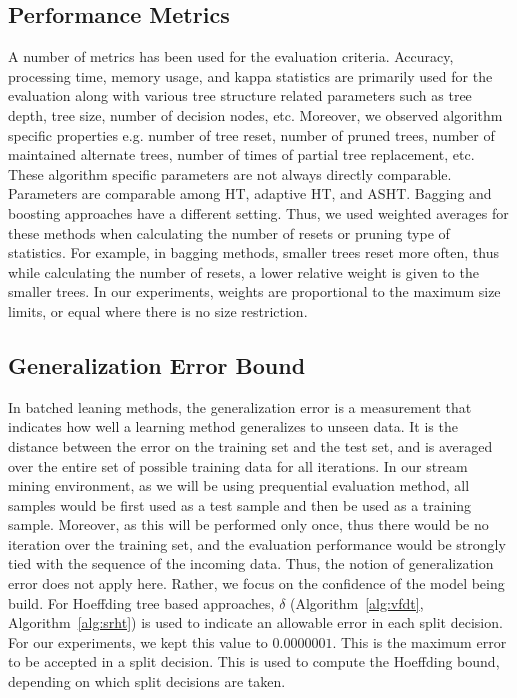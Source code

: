\subsection{Performance Metrics}
A number of metrics has been used for the evaluation criteria. Accuracy, processing time, memory usage, and kappa statistics are primarily used for the evaluation along with various tree structure related parameters such as tree depth, tree size, number of decision nodes, etc. Moreover, we observed algorithm specific properties e.g. number of tree reset, number of pruned trees, number of maintained alternate trees, number of times of partial tree replacement, etc. These algorithm specific parameters are not always directly comparable. Parameters are comparable among HT, adaptive HT, and ASHT. Bagging and boosting approaches have a different setting. Thus, we used weighted averages for these methods when calculating the number of resets or pruning type of statistics. For example, in bagging methods, smaller trees reset more often, thus while calculating the number of resets, a lower relative weight is given to the smaller trees. In our experiments, weights are proportional to the maximum size limits, or equal where there is no size restriction.

\subsection{Generalization Error Bound}
In batched leaning methods, the generalization error is a measurement that indicates how well a learning method generalizes to unseen data. It is the distance between the error on the training set and the test set, and is averaged over the entire set of possible training data for all iterations. In our stream mining environment, as we will be using prequential evaluation method, all samples would be first used as a test sample and then be used as a training sample. Moreover, as this will be performed only once, thus there would be no iteration over the training set, and the evaluation performance would be strongly tied with the sequence of  the incoming data. Thus, the notion of generalization error does not apply here. Rather, we focus on the confidence of the model being build. For Hoeffding tree based approaches, $\delta$ (Algorithm~\ref{alg:vfdt}, Algorithm~\ref{alg:srht}) is used to indicate an allowable error in each split decision. For our experiments, we kept this value to $0.0000001$. This is the maximum error to be accepted in a split decision. This is used to compute the Hoeffding bound, depending on which split decisions are taken.

